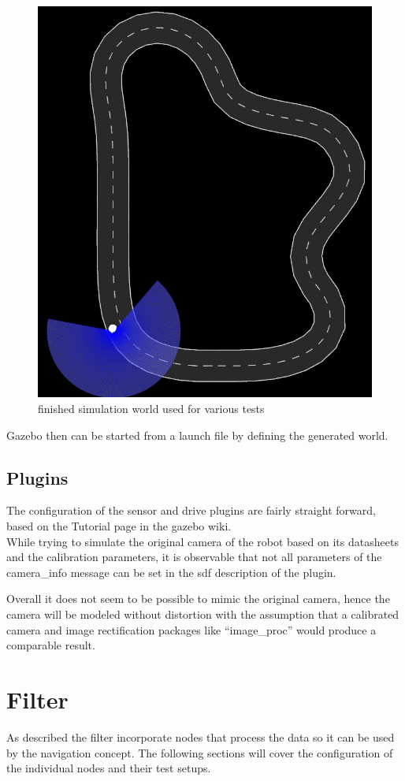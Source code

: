 \begin{figure}
	\centering
	\includegraphics[width=.5\textwidth]{Pictures/test track}
	\caption{finished simulation world used for various tests}
	\label{simworld}
\end{figure}

Gazebo then can be started from a launch file by defining the generated world.\\

\subsection{Plugins}
The configuration of the sensor and drive plugins are fairly straight forward, based on the Tutorial page in the gazebo wiki\cite{gazebotutorial}.\\



While trying to simulate the original camera of the robot based on its datasheets and the calibration parameters, it is observable that not all parameters of the camera\_info message can be set in the sdf description of the plugin.

Overall it does not seem to be possible to mimic the original camera, hence the camera will be modeled without distortion with the assumption that a calibrated camera and image rectification packages like ``image\_proc'' would produce a comparable result.





\section{Filter}

As described the filter incorporate nodes that process the data so it can be used by the navigation concept. The following sections will cover the configuration of the individual nodes and their test setups.

